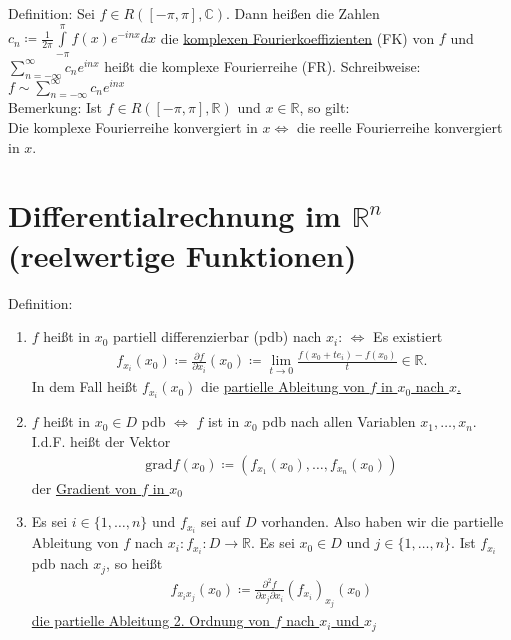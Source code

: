 \documentclass{article}
\begin{document}
Definition: Sei $f \in R([-\pi,\pi],\mathbb{C})$. Dann heißen die Zahlen $c_n \coloneqq \frac{1}{2\pi} \int \limits_{-\pi}^{\pi} f(x) e^{-inx} dx$
die \underline{komplexen Fourierkoeffizienten} (FK) von $f$ und $\sum \limits_{n= - \infty}^{\infty} c_n e^{inx}$ heißt
die komplexe Fourierreihe (FR). Schreibweise: $f \sim \sum \limits_{n=- \infty}^{\infty} c_n e^{inx}$ \\
Bemerkung: Ist $f \in R([-\pi, \pi], \mathbb{R}) \text{ und } x \in \mathbb{R}$, so gilt: \\
Die komplexe Fourierreihe konvergiert in $x \Leftrightarrow$ die reelle Fourierreihe konvergiert in $x$.

\section{Differentialrechnung im $\mathbb{R}^n$ (reelwertige Funktionen)}
Definition:
\begin{enumerate}
    \item $f$ heißt in $x_0$ partiell differenzierbar (pdb) nach $x_i$: $\Leftrightarrow$
    Es existiert 
    \begin{align*}
        f_{x_i}(x_0) \coloneqq \frac{\partial f}{\partial x_i}(x_0) \coloneqq \lim \limits_{t \to 0} \frac{f(x_0 + te_i) - f(x_0)}{t} \in \mathbb{R}.
    \end{align*}
    In dem Fall heißt $f_{x_i}(x_0)$ die \underline{partielle Ableitung von $f$ in $x_0$ nach $x$.}
    \item $f$ heißt in $x_0 \in D$ pdb $\Leftrightarrow$ $f$ ist in $x_0$ pdb nach allen Variablen $x_1,\ldots,x_n$.
    I.d.F. heißt der Vektor
    \begin{align*}
        \text{grad} f(x_0) \coloneqq (f_{x_1}(x_0),\ldots,f_{x_n}(x_0))
    \end{align*}
    der \underline{Gradient von $f$ in $x_0$}
    \item Es sei $i \in \{1,\ldots,n\}$ und $f_{x_i}$ sei auf $D$ vorhanden. Also haben wir die partielle Ableitung von $f$ nach $x_i: f_{x_i}: D \to \mathbb{R}$.
    Es sei $x_0 \in D$ und $j \in \{1, \ldots,n \}$. Ist $f_{x_i}$ pdb nach $x_j$, so heißt
    \begin{align*}
        f_{x_ix_j}(x_0) \coloneqq \frac{\partial^2 f}{\partial x_j \partial x_i} (f_{x_i})_{x_j}(x_0)
    \end{align*}
    \underline{die partielle Ableitung 2. Ordnung von $f$ nach $x_i$ und $x_j$}
\end{enumerate}
\end{document}
